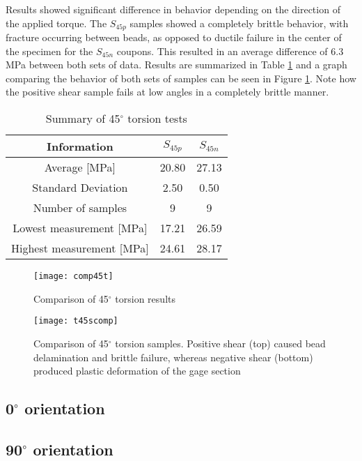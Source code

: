 \documentclass[main.tex]{subfiles}
\begin{document}
Results showed significant difference in behavior depending on the direction of the applied torque. The $S_{45p}$ samples showed a completely brittle behavior, with fracture occurring between beads, as opposed to ductile failure in the center of the specimen for the $S_{45n}$ coupons. This resulted in an average difference of 6.3 MPa between both sets of data. Results are summarized in Table \ref{tab:tors45r} and a graph comparing the behavior of both sets of samples can be seen in Figure \ref{fig:45comp}. Note how the positive shear sample fails at low angles in a completely brittle manner.

\begin{table} [h]
	\centering
	\caption{Summary of 45$^\circ$ torsion tests}
\begin{tabular}{ c| c c } 
	\toprule
	\textbf{Information} & $S_{45p}$ & $S_{45n}$\\
	\midrule
	Average [MPa] & 20.80 & 27.13\\
	Standard Deviation & 2.50 & 0.50\\
	Number of samples & 9 & 9\\
	Lowest measurement [MPa] &17.21  & 26.59\\
	Highest measurement [MPa] &24.61 & 28.17\\
	\bottomrule
\end{tabular}
\label{tab:tors45r}
\end{table}

\begin{figure}[!htbp]
	\center
	\texttt{[image: comp45t]}
	\caption{Comparison of 45$^\circ$ torsion results} \label{fig:45comp}
\end{figure}

\begin{figure}[!htbp]
	\center
	\texttt{[image: t45scomp]}
	\captionsetup{justification=centering} %
	\caption[Comparison of 45$^\circ$ torsion results]{Comparison of 45$^\circ$ torsion samples. Positive shear (top) caused bead delamination and brittle failure, whereas negative shear (bottom) produced plastic deformation of the gage section} \label{fig:45scomp}
\end{figure}
  
\subsection{0$^\circ$ orientation} \label{ssec:0r}
\subsection{90$^\circ$ orientation} \label{ssec:90r}
\end{document}
